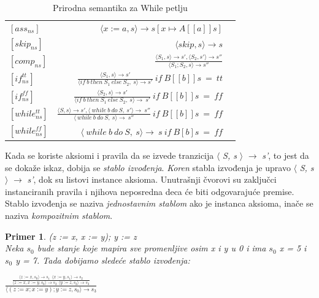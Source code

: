 \documentclass[a4paper]{article}
\newtheorem{primer}{Primer}[section]
\begin{document}
{\begin{table}[h]
       \caption{Prirodna semantika za While petlju}
    	\begin{center}
        \begin{tabular}{lrc}\hline
        \hline
        \hline
        $[ass_{ns}] $ & $ \langle x := a, s \rangle \rightarrow s[x \mapsto A[[a]]s]$    \\  [6pt]
        $[skip_{ns}] $ & $ \langle skip, s \rangle \rightarrow s$   \\ [6pt]
         $[comp_{ns}] $ & $ \frac{\langle S_1, s \rangle \rightarrow s', \langle S_2, s' \rangle \rightarrow s''}{\langle S_1;S_2, s \rangle \rightarrow s''}$ \\[6pt]
            $[if^{tt}_{ns}] $ & $ \frac{\langle S_1, s \rangle \rightarrow s'}{\langle if\ b\ then\ S_1\ else\ S_2,\ s \rangle \rightarrow s'}\  if\ B[[b]]s\ =\ tt $ \\ [6pt]
            $[if^{ff}_{ns}] $ & $ \frac{\langle S_2, s \rangle \rightarrow s'}{\langle if\ b\ then\ S_1\ else\ S_2,\ s \rangle \rightarrow\ s'}\  if\ B[[b]]s\ =\ ff $ \\ [6pt]
            $[while^{tt}_{ns}] $ & $ \frac{\langle S, s \rangle \rightarrow s', \langle\ while\ b\ do\ S,\ s' \rangle \rightarrow\ s''}{\langle\ while\ b\ do\ S,\ s \rangle \rightarrow\ s''}\ if\ B[[b]]s\ =\ ff $ \\ [6pt]
             $[while^{ff}_{ns}] $ & $ \langle\ while\ b\ do\ S,\ s \rangle \rightarrow\ s\ if\ B[b]s\ =\ ff$ \\ [6pt]
          \hline \hline
        \end{tabular}
     \label{tab:b}
    \end{center}
\end{table}

Kada se koriste aksiomi i pravila da se izvede tranzicija $\langle$ \textit{S, s} $\rangle$ $\rightarrow$ \textit{s'}, to jest da se dokaže iskaz, dobija se \textit{stablo izvođenja}. \textit{Koren} stabla izvođenja je upravo $\langle$ \textit{S, s} $\rangle$ $\rightarrow$ \textit{s'}, dok su listovi instance aksioma. Unutrašnji čvorovi su zaključci instanciranih pravila i njihova neposredna deca će biti odgovarajuće premise. Stablo izvođenja se naziva \textit{jednostavnim stablom} ako je instanca aksioma, inače se naziva \textit{kompozitnim stablom}.\\

\begin{primer}
(z := x, x := y); y := z \\
Neka $s_0$ bude stanje koje mapira sve promenljive osim x i y u 0 i ima $s_0$ x = 5 i $s_0$ y = 7. Tada dobijamo sledeće stablo izvođenja:
\end{primer}
{\Large\begin{center}$\frac{\frac{\langle z := x, s_0 \rangle \rightarrow s_1\ \ \langle x := y, s_1 \rangle \rightarrow s_2}{\langle z := x, x := y, s_0\rangle \rightarrow s_2\ \ \langle y := z, s_2 \rangle \rightarrow s_3}}{\langle (z := x; x := y); y := z, s_0 \rangle \rightarrow s_3}$ \end{center}}}
\end{document}
